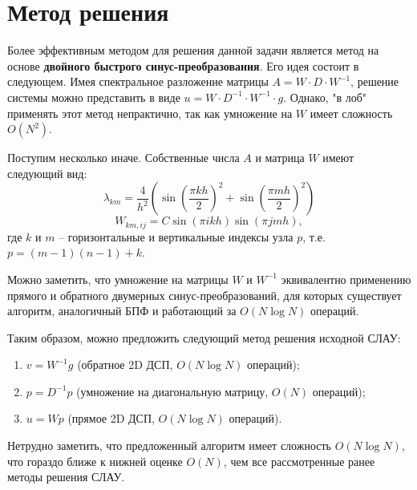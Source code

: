 \documentclass[a4paper]{article}
\begin{document}
	\section{Метод решения}
		Более эффективным методом для решения данной задачи является метод на основе \textbf{двойного быстрого синус-преобразования}. Его идея состоит в следующем. Имея спектральное разложение матрицы $A=W\cdot D \cdot W^{-1}$, решение системы можно представить в виде $u=W \cdot D^{-1} \cdot W^{-1} \cdot g$. Однако, "в лоб"{} применять этот метод непрактично, так как умножение на $W$ имеет сложность $O(N^2)$. 
		
		Поступим несколько иначе. Собственные числа $A$ и матрица $W$ имеют следующий вид:
		\begin{equation}
		\lambda_{km}=\frac{4}{h^2} \left( \sin\left(\frac{\pi k h}{2}\right)^2 + 
		             \sin\left(\frac{\pi m h}{2}\right)^2 \right)
		\end{equation}
		\begin{equation}
		W_{km,ij} = C\sin(\pi ikh)\sin(\pi jmh),
		\end{equation} где $k$ и $m$ -- горизонтальные и вертикальные индексы узла $p$, т.е. $p=(m-1)(n-1)+k$.
		
		Можно заметить, что умножение на матрицы $W$ и $W^{-1}$ эквивалентно применению прямого и обратного двумерных синус-преобразований, для которых существует алгоритм, аналогичный БПФ и работающий за $O(N\log N)$ операций.
		
		Таким образом, можно предложить следующий метод решения исходной СЛАУ:
		\begin{enumerate}
			\item $v=W^{-1}g$ (обратное 2D ДСП, $O(N\log N)$ операций);
			\item $p=D^{-1}p$ (умножение на диагональную матрицу, $O(N)$ операций);
			\item $u=Wp$ (прямое 2D ДСП, $O(N\log N)$ операций).
		\end{enumerate}
	
		Нетрудно заметить, что предложенный алгоритм имеет сложность $O(N\log N)$, что гораздо ближе к нижней оценке $O(N)$, чем все рассмотренные ранее методы решения СЛАУ.
\end{document}

